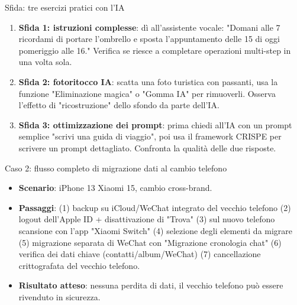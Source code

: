 \begin{tcbpractice}{Sfida: tre esercizi pratici con l'IA}
\begin{enumerate}
  \item \textbf{Sfida 1: istruzioni complesse}: dì all'assistente vocale: "Domani alle 7 ricordami di portare l'ombrello e sposta l'appuntamento delle 15 di oggi pomeriggio alle 16." Verifica se riesce a completare operazioni multi-step in una volta sola.
  \item \textbf{Sfida 2: fotoritocco IA}: scatta una foto turistica con passanti, usa la funzione "Eliminazione magica" o "Gomma IA" per rimuoverli. Osserva l'effetto di "ricostruzione" dello sfondo da parte dell'IA.
  \item \textbf{Sfida 3: ottimizzazione dei prompt}: prima chiedi all'IA con un prompt semplice "scrivi una guida di viaggio", poi usa il framework CRISPE per scrivere un prompt dettagliato. Confronta la qualità delle due risposte.
\end{enumerate}

\end{tcbpractice}

\begin{tcbinfo}{Caso 2: flusso completo di migrazione dati al cambio telefono}
\begin{itemize}
  \item \textbf{Scenario}: iPhone 13 Xiaomi 15, cambio cross-brand.
  \item \textbf{Passaggi}: (1) backup su iCloud/WeChat integrato del vecchio telefono (2) logout dell'Apple ID + disattivazione di "Trova" (3) sul nuovo telefono scansione con l'app "Xiaomi Switch" (4) selezione degli elementi da migrare (5) migrazione separata di WeChat con "Migrazione cronologia chat" (6) verifica dei dati chiave (contatti/album/WeChat) (7) cancellazione crittografata del vecchio telefono.
  \item \textbf{Risultato atteso}: nessuna perdita di dati, il vecchio telefono può essere rivenduto in sicurezza.
\end{itemize}

\end{tcbinfo}
